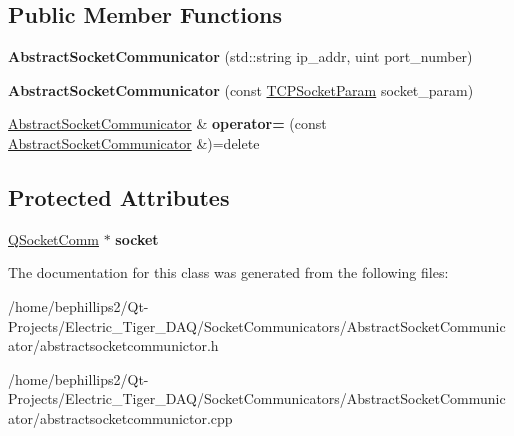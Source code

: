 \subsection*{Public Member Functions}
\begin{DoxyCompactItemize}
\item 
{\bfseries Abstract\+Socket\+Communicator} (std\+::string ip\+\_\+addr, uint port\+\_\+number)\hypertarget{class_abstract_socket_communicator_a94b6e0b544fadba42bd3a5c6f4a549fd}{}\label{class_abstract_socket_communicator_a94b6e0b544fadba42bd3a5c6f4a549fd}

\item 
{\bfseries Abstract\+Socket\+Communicator} (const \hyperlink{struct_t_c_p_socket_param}{T\+C\+P\+Socket\+Param} socket\+\_\+param)\hypertarget{class_abstract_socket_communicator_a0d5d09d52f50e951ee7d5710b06a7a9d}{}\label{class_abstract_socket_communicator_a0d5d09d52f50e951ee7d5710b06a7a9d}

\item 
\hyperlink{class_abstract_socket_communicator}{Abstract\+Socket\+Communicator} \& {\bfseries operator=} (const \hyperlink{class_abstract_socket_communicator}{Abstract\+Socket\+Communicator} \&)=delete\hypertarget{class_abstract_socket_communicator_a7ee57a3af5927ac08f515055dbcdc829}{}\label{class_abstract_socket_communicator_a7ee57a3af5927ac08f515055dbcdc829}

\end{DoxyCompactItemize}
\subsection*{Protected Attributes}
\begin{DoxyCompactItemize}
\item 
\hyperlink{class_q_socket_comm}{Q\+Socket\+Comm} $\ast$ {\bfseries socket}\hypertarget{class_abstract_socket_communicator_a7e69037572c26cf596bd117490f9d6c1}{}\label{class_abstract_socket_communicator_a7e69037572c26cf596bd117490f9d6c1}

\end{DoxyCompactItemize}


The documentation for this class was generated from the following files\+:\begin{DoxyCompactItemize}
\item 
/home/bephillips2/\+Qt-\/\+Projects/\+Electric\+\_\+\+Tiger\+\_\+\+D\+A\+Q/\+Socket\+Communicators/\+Abstract\+Socket\+Communicator/abstractsocketcommunictor.\+h\item 
/home/bephillips2/\+Qt-\/\+Projects/\+Electric\+\_\+\+Tiger\+\_\+\+D\+A\+Q/\+Socket\+Communicators/\+Abstract\+Socket\+Communicator/abstractsocketcommunictor.\+cpp\end{DoxyCompactItemize}
